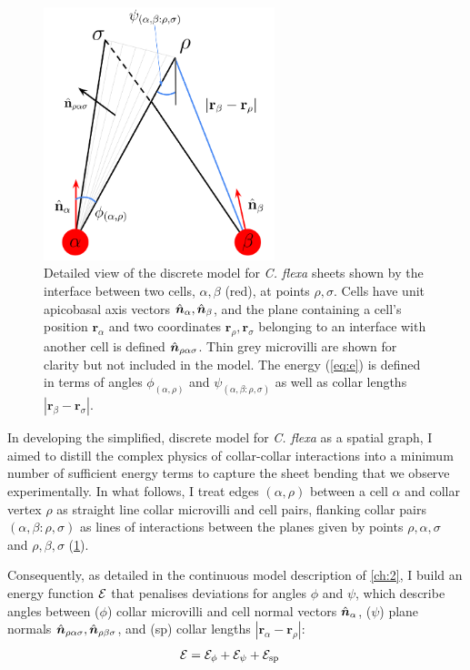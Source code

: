 \begin{figure}[tbhp]
	\centering
	\includegraphics[width=0.6\textwidth]{model.png}
	\caption[Discrete model details]{Detailed view of the discrete model for \textit{C. flexa} sheets shown by the interface between two cells, $\alpha, \beta$ (red), at points $\rho,\sigma$. Cells have unit apicobasal axis vectors $\hat{\bm{n}}_\alpha, \hat{\bm{n}}_\beta$, and the plane containing a cell's position $\bm{r}_\alpha$ and two coordinates $\bm{r}_\rho,\bm{r}_\sigma$ belonging to an interface with another cell is defined $\hat{\bm{n}}_{\rho\alpha\sigma}$. Thin grey microvilli are shown for clarity but not included in the model. The energy (\cref{eq:e}) is defined in terms of angles $\phi_{(\alpha,\rho)}$ and $\psi_{(\alpha,\beta:\rho,\sigma)}$ as well as collar lengths $|\bm{r}_\beta - \bm{r}_\sigma|$.}
	\label{fig:model_details}
\end{figure}

In developing the simplified, discrete model for \textit{C. flexa} as a spatial graph, I aimed to distill the complex physics of collar-collar interactions into a minimum number of sufficient energy terms to capture the sheet bending that we observe experimentally. 
In what follows, I treat edges $(\alpha, \rho)$ between a cell $\alpha$ and collar vertex $\rho$ as straight line collar microvilli and cell pairs, flanking collar pairs $(\alpha, \beta: \rho, \sigma)$ as lines of interactions between the planes given by points $\rho, \alpha, \sigma$ and $\rho, \beta, \sigma$ (\cref{fig:model_details}). 

Consequently, as detailed in the continuous model description of \cref{ch:2}, I build an energy function $\mathcal{E}$ that penalises deviations for angles $\phi$ and $\psi$, which describe angles between ($\phi$) collar microvilli and cell normal vectors $\hat{\bm{n}}_\alpha$, ($\psi$) plane normals $\hat{\bm{n}}_{\rho\alpha\sigma}, \hat{\bm{n}}_{\rho\beta\sigma}$, and (sp) collar lengths $|\bm{r}_\alpha - \bm{r}_\rho|$:
\begin{align}
	\mathcal{E} &= \mathcal{E}_\phi + \mathcal{E}_\psi + \mathcal{E}_{\text{sp}} \label{eq:e}
\end{align}

